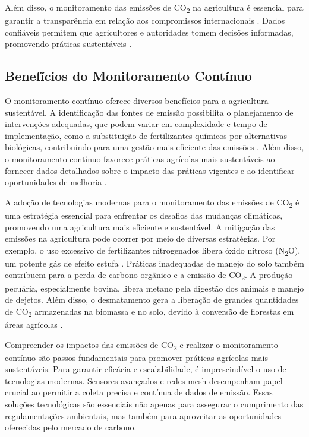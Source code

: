 Além disso, o monitoramento das emissões de CO\textsubscript{2} na agricultura é essencial para garantir a transparência em relação aos compromissos internacionais \cite{unfccc2020markets}. Dados confiáveis permitem que agricultores e autoridades tomem decisões informadas, promovendo práticas sustentáveis \cite{ipcc2019land}.

\subsection{Benefícios do Monitoramento Contínuo}

O monitoramento contínuo oferece diversos benefícios para a agricultura sustentável. A identificação das fontes de emissão possibilita o planejamento de intervenções adequadas, que podem variar em complexidade e tempo de implementação, como a substituição de fertilizantes químicos por alternativas biológicas, contribuindo para uma gestão mais eficiente das emissões \cite{MAPA2024}. Além disso, o monitoramento contínuo favorece práticas agrícolas mais sustentáveis ao fornecer dados detalhados sobre o impacto das práticas vigentes e ao identificar oportunidades de melhoria \cite{tsi2023outdoor}. 

A adoção de tecnologias modernas para o monitoramento das emissões de CO\textsubscript{2} é uma estratégia essencial para enfrentar os desafios das mudanças climáticas, promovendo uma agricultura mais eficiente e sustentável. A mitigação das emissões na agricultura pode ocorrer por meio de diversas estratégias. Por exemplo, o uso excessivo de fertilizantes nitrogenados libera óxido nitroso (N\textsubscript{2}O), um potente gás de efeito estufa \cite{ipcc2019land}. Práticas inadequadas de manejo do solo também contribuem para a perda de carbono orgânico e a emissão de CO\textsubscript{2}. A produção pecuária, especialmente bovina, libera metano pela digestão dos animais e manejo de dejetos. Além disso, o desmatamento gera a liberação de grandes quantidades de CO\textsubscript{2} armazenadas na biomassa e no solo, devido à conversão de florestas em áreas agrícolas \cite{fao2023}.

Compreender os impactos das emissões de CO\textsubscript{2} e realizar o monitoramento contínuo são passos fundamentais para promover práticas agrícolas mais sustentáveis. Para garantir eficácia e escalabilidade, é imprescindível o uso de tecnologias modernas. Sensores avançados e redes mesh desempenham papel crucial ao permitir a coleta precisa e contínua de dados de emissão. Essas soluções tecnológicas são essenciais não apenas para assegurar o cumprimento das regulamentações ambientais, mas também para aproveitar as oportunidades oferecidas pelo mercado de carbono.

